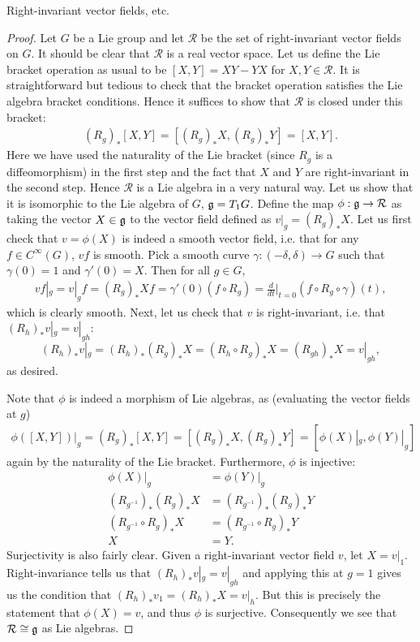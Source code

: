 \documentclass{../../mathnotes}
\begin{document}
\begin{prop}
    Right-invariant vector fields, etc.
\end{prop}
\begin{proof}
    Let $G$ be a Lie group and let $\mathcal{R}$ be the set of right-invariant vector fields on $G$. It should be clear that $\mathcal{R}$ is a
    real vector space. Let us define the Lie bracket operation as usual to be $[X,Y]=XY-YX$ for $X,Y\in\mathcal{R}$. It is straightforward but tedious to
    check that the bracket operation satisfies the Lie algebra bracket conditions. Hence it suffices to show that $\mathcal{R}$ is closed under this bracket:
    \begin{align*}
        (R_g)_*[X,Y]=[(R_g)_*X,(R_g)_*Y]=[X,Y].
    \end{align*}
    Here we have used the naturality of the Lie bracket (since $R_g$ is a diffeomorphism) in the first step and the fact that $X$ and $Y$ are right-invariant in the second step.
    Hence $\mathcal{R}$ is a Lie algebra in a very natural way. Let us show that it is isomorphic to the Lie algebra of $G$, $\mathfrak g=T_1G$.
    Define the map $\phi:\mathfrak g\to\mathcal{R}$ as taking the vector $X\in\mathfrak g$ to the vector field defined as $v|_g=(R_g)_*X$.
    Let us first check that $v=\phi(X)$ is indeed a smooth vector field, i.e. that for any $f\in C^\infty(G)$, $vf$ is smooth. Pick a smooth curve
    $\gamma:\left(-\delta,\delta \right)\to G$ such that $\gamma(0)=1$ and $\gamma'(0)=X$. Then for all $g\in G$,
    \begin{align*}
        vf|_g=v|_gf=(R_g)_*X f=\gamma'(0)\left( f\circ R_g \right)=\frac{d}{dt}\bigg|_{t=0}\left( f\circ R_g\circ \gamma \right)(t),
    \end{align*}
    which is clearly smooth. Next, let us check that $v$ is right-invariant, i.e. that $(R_h)_*v|_g=v|_{gh}$:
    \[(R_h)_*v|_g=(R_h)_*(R_g)_*X=(R_h\circ R_g)_*X=(R_{gh})_*X=v|_{gh},\]
    as desired.

    Note that $\phi$ is indeed a morphism of Lie algebras, as (evaluating the vector fields at $g$)
    \begin{align*}
        \phi([X,Y])|_g=(R_g)_*[X,Y]=[(R_g)_*X,(R_g)_*Y]=[\phi(X)|_g,\phi(Y)|_g]
    \end{align*}
    again by the naturality of the Lie bracket. Furthermore, $\phi$ is injective:
    \begin{align*}
        \phi(X)|_g&=\phi(Y)|_g\\
        (R_{g^{-1}})_*(R_g)_*X&=(R_{g^{-1}})_*(R_g)_*Y\\
        (R_{g^{-1}}\circ R_g)_*X&=(R_{g^{-1}}\circ R_g)_*Y\\
        X&=Y.
    \end{align*}
    Surjectivity is also fairly clear. Given a right-invariant vector field $v$, let $X=v|_1$. Right-invariance tells us that
    $(R_h)_*v|_g=v|_{gh}$ and applying this at $g=1$ gives us the condition that $(R_h)_*v_1=(R_h)_*X=v|_h$. But this is precisely
    the statement that $\phi(X)=v$, and thus $\phi$ is surjective. Consequently we see that $\mathcal{R}\cong\mathfrak g$ as Lie algebras.


\end{proof}
\end{document}
